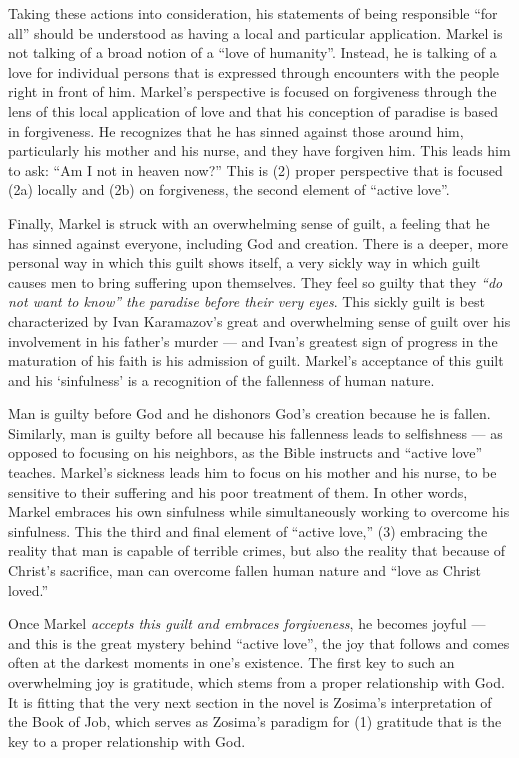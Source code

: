 Taking these actions into consideration, his statements of being responsible ``for all'' should be understood as having a local and particular application. Markel is not talking of a broad notion of a ``love of humanity''. Instead, he is talking of a love for individual persons that is expressed through encounters with the people right in front of him. Markel's perspective is focused on forgiveness through the lens of this local application of love and that his conception of paradise is based in forgiveness. He recognizes that he has sinned against those around him, particularly his mother and his nurse, and they have forgiven him. This leads him to ask: ``Am I not in heaven now?'' This is (2) proper perspective that is focused (2a) locally and (2b) on forgiveness, the second element of ``active love''.

Finally, Markel is struck with an overwhelming sense of guilt, a feeling that he has sinned against everyone, including God and creation. There is a deeper, more personal way in which this guilt shows itself, a very sickly way in which guilt causes men to bring suffering upon themselves. They feel so guilty that they \emph{``do not want to know'' the paradise before their very eyes}. This sickly guilt is best characterized by Ivan Karamazov's great and overwhelming sense of guilt over his involvement in his father's murder --- and Ivan's greatest sign of progress in the maturation of his faith is his admission of guilt. Markel's acceptance of this guilt and his `sinfulness' is a recognition of the fallenness of human nature. 

Man is guilty before God and he dishonors God's creation because he is fallen. Similarly, man is guilty before all because his fallenness leads to selfishness --- as opposed to focusing on his neighbors, as the Bible instructs and ``active love'' teaches. Markel's sickness leads him to focus on his mother and his nurse, to be sensitive to their suffering and his poor treatment of them. In other words, Markel embraces his own sinfulness while simultaneously working to overcome his sinfulness. This the third and final element of ``active love,'' (3) embracing the reality that man is capable of terrible crimes, but also the reality that because of Christ's sacrifice, man can overcome fallen human nature and ``love as Christ loved.'' 

Once Markel \emph{accepts this guilt and embraces forgiveness}, he becomes joyful --- and this is the great mystery behind ``active love'', the joy that follows and comes often at the darkest moments in one's existence. The first key to such an overwhelming joy is gratitude, which stems from a proper relationship with God. It is fitting that the very next section in the novel is Zosima's interpretation of the Book of Job, which serves as Zosima's paradigm for (1) gratitude that is the key to a proper relationship with God.

